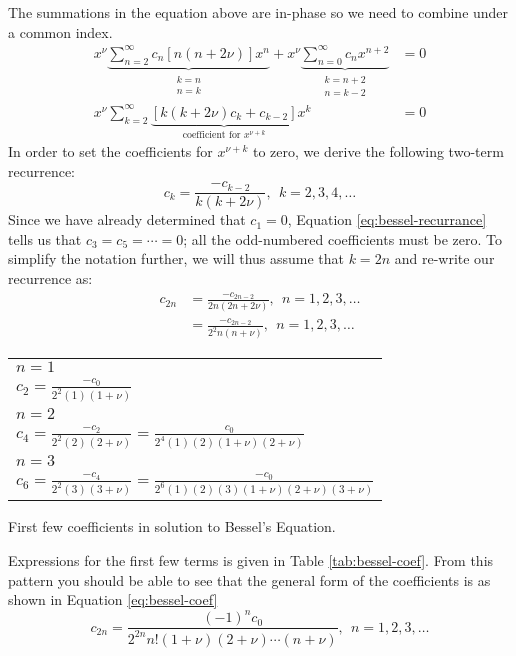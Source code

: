 The summations in the equation above are in-phase so we need to combine under a common index. 
\begin{align*}
x^{\nu}\underbrace{\sum\limits_{n=2}^{\infty}c_n[n(n+2\nu)]x^n}_{\substack{k=n \\ n=k}} + x^{\nu}\underbrace{\sum\limits_{n=0}^{\infty}c_nx^{n+2}}_{\substack{k=n+2 \\ n=k-2}} &= 0 \\
x^{\nu}\sum\limits_{k=2}^{\infty}\underbrace{\left[k(k+2\nu)c_k + c_{k-2}\right]}_{\text{coefficient for } x^{\nu+k}}x^{k} &= 0
\end{align*}
In order to set the coefficients for $x^{\nu+k}$ to zero, we derive the following two-term recurrence:
\begin{equation}
c_k = \frac{-c_{k-2}}{k(k+2\nu)}, \ \ k=2,3,4,\dots
\label{eq:bessel-recurrance}
\end{equation}
Since we have already determined that $c_1=0$, Equation \ref{eq:bessel-recurrance} tells us that $c_3=c_5=\cdots=0$; all the odd-numbered coefficients must be zero. To simplify the notation further, we will thus assume that $k=2n$ and re-write our recurrence as:
\begin{align*}
c_{2n} &= \frac{-c_{2n-2}}{2n(2n+2\nu)}, \ \ n=1,2,3,\dots \\
&=\frac{-c_{2n-2}}{2^2n(n+\nu)}, \ \ n=1,2,3,\dots
\end{align*}
\begin{margintable}
\begin{tabular}{|l|}
\hline
$n=1$ \\
$c_2 = \frac{-c_0}{2^2(1)(1+\nu)}$ \\\hline
$n=2$ \\
$c_4 = \frac{-c_2}{2^2 (2)(2+\nu)} = \frac{c_0}{2^4(1)(2)(1+\nu)(2+\nu)}$\\\hline
$n=3$ \\
$c_6 = \frac{-c_4}{2^2 (3)(3+\nu)} = \frac{-c_0}{2^6(1)(2)(3)(1+\nu)(2+\nu)(3+\nu)}$ \\\hline
\end{tabular}
\caption{First few coefficients in solution to Bessel's Equation.}
\label{tab:bessel-coef}
\end{margintable}
\noindent Expressions for the first few terms is given in Table \ref{tab:bessel-coef}. From this pattern you should be able to see that the general form of the coefficients is as shown in Equation \ref{eq:bessel-coef}
\begin{equation}
c_{2n} = \frac{(-1)^n c_0}{2^{2n}n!(1+\nu)(2+\nu)\cdots(n+\nu)}, \ \ n=1,2,3,\dots
\label{eq:bessel-coef}
\end{equation}
